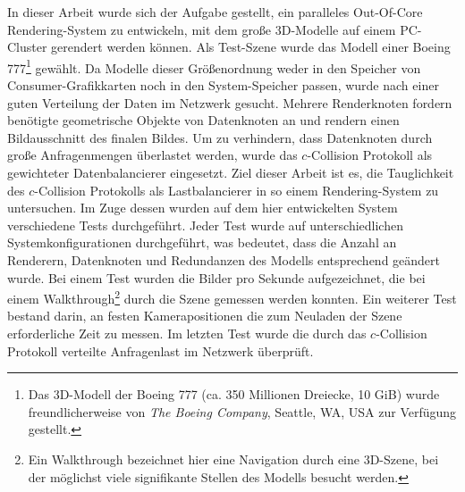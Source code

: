 In dieser Arbeit wurde sich der Aufgabe gestellt, ein paralleles Out-Of-Core Rendering-System zu entwickeln, mit dem große 3D-Modelle auf einem PC-Cluster gerendert werden können. Als Test-Szene wurde das Modell einer Boeing 777\footnote{Das 3D-Modell der Boeing 777 (ca. 350 Millionen Dreiecke, 10 GiB) wurde freundlicherweise von \textit{The Boeing Company}, Seattle, WA, USA zur Verfügung gestellt.} gewählt. Da Modelle dieser Größenordnung weder in den Speicher von Consumer-Grafikkarten noch in den System-Speicher passen, wurde nach einer guten Verteilung der Daten im Netzwerk gesucht. Mehrere Renderknoten fordern benötigte geometrische Objekte von Datenknoten an und rendern einen Bildausschnitt des finalen Bildes. Um zu verhindern, dass Datenknoten durch große Anfragenmengen überlastet werden, wurde das $c$-Collision Protokoll als gewichteter Datenbalancierer eingesetzt. Ziel dieser Arbeit ist es, die Tauglichkeit des $c$-Collision Protokolls als Lastbalancierer in so einem Rendering-System zu untersuchen. Im Zuge dessen wurden auf dem hier entwickelten System verschiedene Tests durchgeführt. Jeder Test wurde auf unterschiedlichen Systemkonfigurationen durchgeführt, was bedeutet, dass die Anzahl an Renderern, Datenknoten und Redundanzen des Modells entsprechend geändert wurde. Bei einem Test wurden die Bilder pro Sekunde aufgezeichnet, die bei einem Walkthrough\footnote{Ein Walkthrough bezeichnet hier eine Navigation durch eine 3D-Szene, bei der möglichst viele signifikante Stellen des Modells besucht werden.} durch die Szene gemessen werden konnten. Ein weiterer Test bestand darin, an festen Kamerapositionen die zum Neuladen der Szene erforderliche Zeit zu messen. Im letzten Test wurde die durch das $c$-Collision Protokoll verteilte Anfragenlast im Netzwerk überprüft.


%
%
